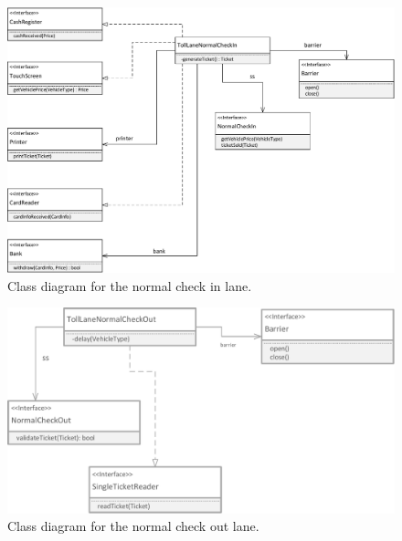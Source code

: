 \begin{figure}[H]
\centerline{\includegraphics[width=\textwidth]{img/class_diagrams/class_diagram_toll_lane_normal_check_in}}
\caption{Class diagram for the normal check in lane.}
\label{fig:cld_tlni}
\end{figure}

\begin{figure}[H]
\centerline{\includegraphics[width=\textwidth]{img/class_diagrams/class_diagram_toll_lane_normal_check_out}}
\caption{Class diagram for the normal check out lane.}
\label{fig:cld_tlno}
\end{figure}